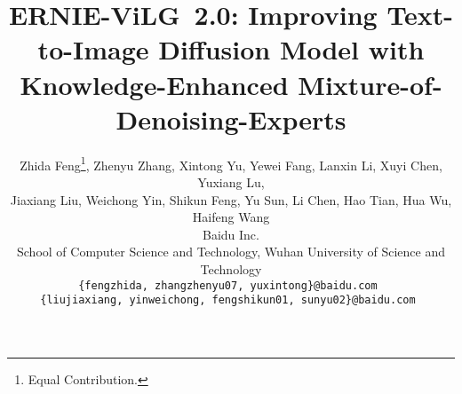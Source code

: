 \documentclass[10pt,twocolumn,letterpaper]{article}
\begin{document}
\title{ERNIE-ViLG~2.0: Improving Text-to-Image Diffusion Model with \\ Knowledge-Enhanced Mixture-of-Denoising-Experts}

\author{
Zhida Feng\thanks{Equal Contribution.}\;, Zhenyu Zhang, Xintong Yu, Yewei Fang, Lanxin Li, Xuyi Chen, Yuxiang Lu, \\ Jiaxiang Liu, Weichong Yin, Shikun Feng, Yu Sun, Li Chen, Hao Tian, Hua Wu, Haifeng Wang \\
Baidu Inc.\\
School of Computer Science and Technology, Wuhan University of Science and Technology \\
{\tt\small \{fengzhida, zhangzhenyu07, yuxintong\}@baidu.com } \\
{\tt\small \{liujiaxiang, yinweichong, fengshikun01, sunyu02\}@baidu.com } \\
}
\end{document}
